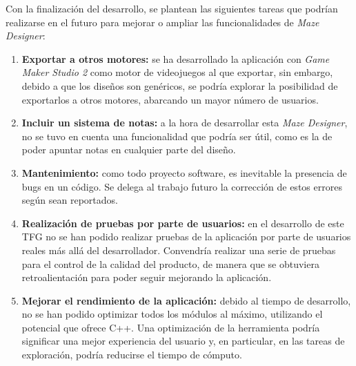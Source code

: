 Con la finalización del desarrollo, se plantean las siguientes tareas que podrían realizarse en el futuro para mejorar o ampliar las funcionalidades de \textit{Maze Designer}:
\begin{enumerate}
	\item \textbf{Exportar a otros motores:} se ha desarrollado la aplicación con \textit{Game Maker Studio 2} como motor de videojuegos al que exportar, sin embargo, debido a que los diseños son genéricos, se podría explorar la posibilidad de exportarlos a otros motores, abarcando un mayor número de usuarios.
	\item \textbf{Incluir un sistema de notas:} a la hora de desarrollar esta \textit{Maze Designer}, no se tuvo en cuenta una funcionalidad que podría ser útil, como es la de poder apuntar notas en cualquier parte del diseño.
	\item \textbf{Mantenimiento:} como todo proyecto software, es inevitable la presencia de bugs en un código. Se delega al trabajo futuro la corrección de estos errores según sean reportados.
	\item \textbf{Realización de pruebas por parte de usuarios:} en el desarrollo de este TFG no se han podido realizar pruebas de la aplicación por parte de usuarios reales más allá del desarrollador. Convendría realizar una serie de pruebas para el control de la calidad del producto, de manera que se obtuviera retroalientación para poder seguir mejorando la aplicación.
	\item \textbf{Mejorar el rendimiento de la aplicación:} debido al tiempo de desarrollo, no se han podido optimizar todos los módulos al máximo, utilizando el potencial que ofrece C++. Una optimización de la herramienta podría significar una mejor experiencia del usuario y, en particular, en las tareas de exploración, podría reducirse el tiempo de cómputo.
\end{enumerate}